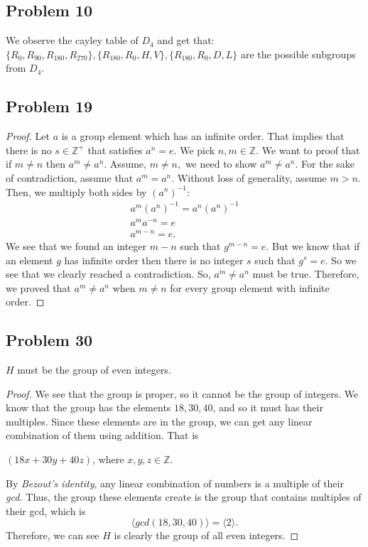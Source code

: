 \documentclass[a4paper,12pt]{article}
\begin{document}
\subsection*{Problem 10}
We observe the cayley table of $D_4$ and get that:\\
$\{R_{0},R_{90},R_{180},R_{270}\}, \{R_{180},R_{0},H,V\}, \{R_{180},R_{0},D,L\}$ are the possible subgroups from $D_4.$
\subsection*{Problem 19}
\begin{proof}
    Let $a$ is a group element which has an infinite order. That implies that there is no $s \in \mathbb{Z^+}$ that satisfies $a^n=e.$ We pick $n,m \in \mathbb{Z}.$ We want to proof that if $m \ne n$ then $a^m \ne a^n.$ Assume, $m \ne n,$ we need to show $a^m \ne a^n.$ For the sake of contradiction, assume that $a^m=a^n.$ Without loss of generality, assume $m>n.$ Then, we multiply both sides by $(a^n)^{-1}:$ 
    \begin{align*}
        a^m(a^n)^{-1}=a^n (a^n)^{-1}\\
        a^m a^{-n}=e\\
        a^{m-n}=e.
    \end{align*}
    We see that we found an integer $m-n$ such that $g^{m-n}=e.$ But we know that if an element $g$ has infinite order then there is no integer $s$ such that $g^s=e.$ So we see that we clearly reached a contradiction. So, $a^m \ne a^n$ must be true. Therefore, we proved that $a^m \ne a^n$ when $m \ne n$ for every group element with infinite order.
\end{proof}
\subsection*{Problem 30}
$H$ must be the group of even integers.
\begin{proof}
We see that the group is proper, so it cannot be the group of integers. We know that the group has the elements $18, 30, 40$, and so it must has their multiples. Since these elements are in the group, we can get any linear combination of them using addition. That is \begin{center}
    $(18x+30y+40z)$, where $x,y,z \in \mathbb{Z}.$
\end{center}
By \textit{Bezout's identity}, any linear combination of numbers is a multiple of their \textit{gcd.} Thus, the group these elements create is the group that contains multiples of their gcd, which is \[\langle gcd(18,30,40)\rangle=\langle 2 \rangle.\]
Therefore, we can see $H$ is clearly the group of all even integers.
\end{proof}
\end{document}
